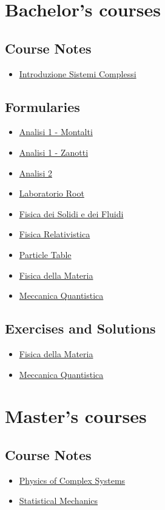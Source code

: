 \documentclass{article}
\begin{document}
\section{Bachelor's courses}

\subsection{Course Notes}

    \begin{itemize}
        \item \href{b_introduzione_sistemi_complessi.html}{Introduzione Sistemi Complessi}
    \end{itemize}

\subsection{Formularies}

    \begin{itemize}
        \item \href{b_formulario_analisi_1_mon.html}{Analisi 1 - Montalti}
        \item \href{b_formulario_analisi_1_zan.html}{Analisi 1 - Zanotti}
        \item \href{b_formulario_analisi_2.html}{Analisi 2}
        \item \href{b_formulario_laboratorio_root.html}{Laboratorio Root}
        \item \href{b_formulario_fisica_dei_solidi_e_dei_fluidi.html}{Fisica dei Solidi e dei Fluidi}
        \item \href{b_formulario_fisica_relativistica.html}{Fisica Relativistica}
        \item \href{b_formulario_particle_table.html}{Particle Table}
        \item \href{b_formulario_materia.html}{Fisica della Materia}
        \item \href{b_formulario_meccanica_quantistica.html}{Meccanica Quantistica}
    \end{itemize}

\subsection{Exercises and Solutions}

    \begin{itemize}
        \item \href{b_exercises_soluzioni_materia.html}{Fisica della Materia}
        \item \href{b_exercises_soluzioni_meccanica_quantistica.html}{Meccanica Quantistica}
    \end{itemize}

\section{Master's courses}

\subsection{Course Notes}

    \begin{itemize}
        \item \href{m_physics_of_complex_systems.html}{Physics of Complex Systems}
        \item \href{m_statistical_mechanics.html}{Statistical Mechanics}
    \end{itemize}
\end{document}
